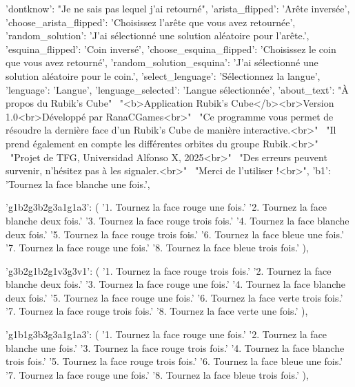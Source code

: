 {{        'dontknow':        "Je ne sais pas lequel j'ai retourné",
        'arista_flipped':  'Arête inversée',
        'choose_arista_flipped': 'Choisissez l’arête que vous avez retournée',
        'random_solution': 'J’ai sélectionné une solution aléatoire pour l’arête.',
        'esquina_flipped': 'Coin inversé',
        'choose_esquina_flipped': 'Choisissez le coin que vous avez retourné',
        'random_solution_esquina': 'J’ai sélectionné une solution aléatoire pour le coin.',
        'select_lenguage': 'Sélectionnez la langue',
        'lenguage':        'Langue',
        'lenguage_selected': 'Langue sélectionnée',
        'about_text':      "À propos du Rubik's Cube" \
                            "<b>Application Rubik's Cube</b><br>Version 1.0<br>Développé par RanaCGames<br>" \
                            "Ce programme vous permet de résoudre la dernière face d'un Rubik's Cube de manière interactive.<br>" \
                            "Il prend également en compte les différentes orbites du groupe Rubik.<br>" \
                            "Projet de TFG, Universidad Alfonso X, 2025<br>" \
                            "Des erreurs peuvent survenir, n'hésitez pas à les signaler.<br>" \
                            "Merci de l'utiliser !<br>",
        'b1': 'Tournez la face blanche une fois.',

        'g1b2g3b2g3a1g1a3': (
            '1. Tournez la face rouge une fois.\n'
            '2. Tournez la face blanche deux fois.\n'
            '3. Tournez la face rouge trois fois.\n'
            '4. Tournez la face blanche deux fois.\n'
            '5. Tournez la face rouge trois fois.\n'
            '6. Tournez la face bleue une fois.\n'
            '7. Tournez la face rouge une fois.\n'
            '8. Tournez la face bleue trois fois.'
        ),

        'g3b2g1b2g1v3g3v1': (
            '1. Tournez la face rouge trois fois.\n'
            '2. Tournez la face blanche deux fois.\n'
            '3. Tournez la face rouge une fois.\n'
            '4. Tournez la face blanche deux fois.\n'
            '5. Tournez la face rouge une fois.\n'
            '6. Tournez la face verte trois fois.\n'
            '7. Tournez la face rouge trois fois.\n'
            '8. Tournez la face verte une fois.'
        ),

        'g1b1g3b3g3a1g1a3': (
            '1. Tournez la face rouge une fois.\n'
            '2. Tournez la face blanche une fois.\n'
            '3. Tournez la face rouge trois fois.\n'
            '4. Tournez la face blanche trois fois.\n'
            '5. Tournez la face rouge trois fois.\n'
            '6. Tournez la face bleue une fois.\n'
            '7. Tournez la face rouge une fois.\n'
            '8. Tournez la face bleue trois fois.'
        ),

}}
